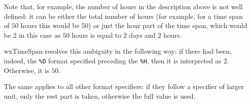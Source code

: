 \twocolwidtha{5cm}%
\begin{twocollist}\itemsep=0pt
\end{twocollist}

Note that, for example, the number of hours in the description above is not
well defined: it can be either the total number of hours (for example, for a
time span of $50$ hours this would be $50$) or just the hour part of the time
span, which would be $2$ in this case as $50$ hours is equal to $2$ days and
$2$ hours.

wxTimeSpan resolves this ambiguity in the following way: if there had been,
indeed, the {\tt \%D} format specified preceding the {\tt \%H}, then it is
interpreted as $2$. Otherwise, it is $50$.

The same applies to all other format specifiers: if they follow a specifier of
larger unit, only the rest part is taken, otherwise the full value is used.

